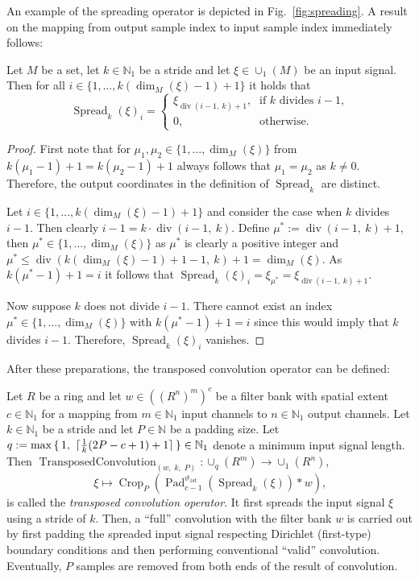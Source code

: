\documentclass[journal]{IEEEtran}
\newcommand{\N}{\mathbb{N}}
\newcommand{\conv}{\ast}
\newcommand{\discint}[2]{\{#1,\dotsc,#2\}}
\newcommand{\inint}[2]{\in\discint{#1}{#2}}
\newcommand{\nceil}[1]{\lceil #1 \rceil}
\renewcommand{\div}[2]{\operatorname{div}(#1,\ #2)}
\DeclareMathOperator{\Padding}{Pad}
\DeclareMathOperator{\Cropping}{Crop}
\DeclareMathOperator{\Spreading}{Spread}
\DeclareMathOperator{\TransposedConvolution}{TransposedConvolution}
\newcommand{\Dirichlet}{1\text{st}}
\begin{document}
An example of the spreading operator is depicted in Fig.~\ref{fig:spreading}.
A result on the mapping from output sample index to input sample index immediately follows:
\begin{lemma}
\label{lem:spreading}
Let $M$ be a set, let $k\in\N_1$ be a stride and let $\xi\in\cup_1(M)$ be an input signal.
Then for all $i\inint{1}{k(\dim_M(\xi) - 1) + 1}$ it holds that
\begin{displaymath}
  \Spreading_k(\xi)_i =
  \begin{cases}
    \xi_{\div{i - 1}{k} + 1}\text{,} & \text{if }k\text{ divides }i - 1\text{,}\\
    0\text{,} & \text{otherwise.}
  \end{cases}
\end{displaymath}
\end{lemma}\begin{proof}
First note that for $\mu_1,\mu_2\inint{1}{\dim_M(\xi)}$ from $k(\mu_1 - 1) + 1 = k(\mu_2 - 1) + 1$ always follows that $\mu_1 = \mu_2$ as $k\neq 0$.
Therefore, the output coordinates in the definition of $\Spreading_k$ are distinct.

Let $i\inint{1}{k(\dim_M(\xi) - 1) + 1}$ and consider the case when $k$ divides $i - 1$.
Then clearly $i - 1 = k\cdot\div{i - 1}{k}$.
Define $\mu^* := \div{i - 1}{k} + 1$, then $\mu^*\inint{1}{\dim_M(\xi)}$ as $\mu^*$ is clearly a positive integer and $\mu^* \leq \div{k(\dim_M(\xi) - 1) + 1 - 1}{k} + 1 = \dim_M(\xi)$.
As $k(\mu^* - 1) + 1 = i$ it follows that $\Spreading_k(\xi)_i = \xi_{\mu^*} = \xi_{\div{i - 1}{k} + 1}$.

Now suppose $k$ does not divide $i - 1$.
There cannot exist an index $\mu^*\inint{1}{\dim_M(\xi)}$ with $k(\mu^* - 1) + 1 = i$ since this would imply that $k$ divides $i - 1$.
Therefore, $\Spreading_k(\xi)_i$ vanishes.
\end{proof}

After these preparations, the transposed convolution operator can be defined:
\begin{definition}
\label{def:trconv}
Let $R$ be a ring and let $w\in((R^n)^m)^c$ be a filter bank with spatial extent $c\in\N_1$ for a mapping from $m\in\N_1$ input channels to $n\in\N_1$ output channels.
Let $k\in\N_1$ be a stride and let $P\in\N$ be a padding size.
Let $q := \max\set{1,\ \nceil{\frac{1}{k}(2P - c + 1) + 1}}\in\N_1$ denote a minimum input signal length.
Then $\TransposedConvolution_{(w,\; k,\; P)}\colon\cup_q(R^m) \to \cup_1(R^n)$,
\begin{displaymath}
  \xi\mapsto \Cropping_P( \Padding_{c - 1}^{\vartheta_{\Dirichlet}}( \Spreading_k(\xi)) \conv w)\text{,}
\end{displaymath}
is called the \emph{transposed convolution operator}.
It first spreads the input signal $\xi$ using a stride of $k$.
Then, a ``full'' convolution with the filter bank $w$ is carried out by first padding the spreaded input signal respecting Dirichlet (first-type) boundary conditions and then performing conventional ``valid'' convolution.
Eventually, $P$ samples are removed from both ends of the result of convolution.
\end{definition}
\end{document}
